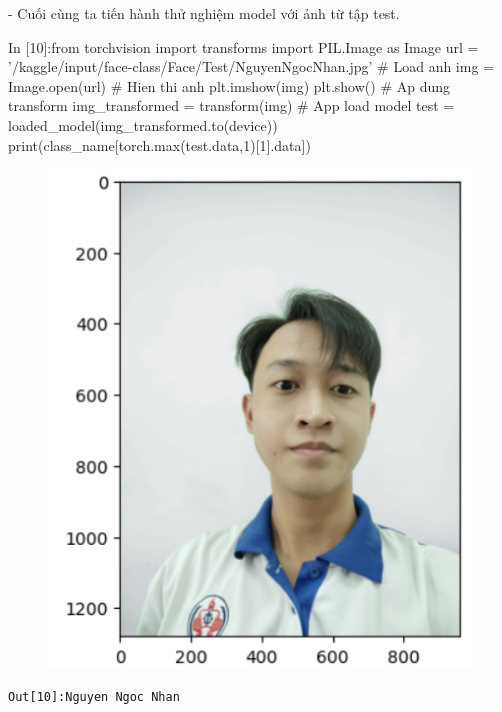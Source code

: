 \documentclass[12pt, a4paper]{article}
\begin{document}
\par - Cuối cùng ta tiến hành thử nghiệm model với ảnh từ tập test.
\begin{python}
In [10]:from torchvision import transforms
        import PIL.Image as Image
        url = '/kaggle/input/face-class/Face/Test/NguyenNgocNhan.jpg'
        # Load anh
        img = Image.open(url)
        # Hien thi anh
        plt.imshow(img)
        plt.show()
        # Ap dung transform
        img_transformed = transform(img)   
        # App load model
        test = loaded_model(img_transformed.to(device))
        print(class_name[torch.max(test.data,1)[1].data])
\end{python}
\begin{figure}[h] %
    \includegraphics[scale = 0.8]{Img/Face/P4.png}
\end{figure}

\begin{verbatim}
Out[10]:Nguyen Ngoc Nhan
\end{verbatim}





\newpage
\end{document}
